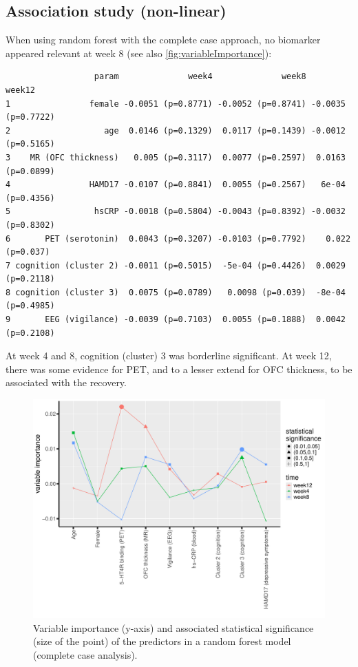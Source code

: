 \documentclass[12pt]{article}
\begin{document}
\subsection{Association study (non-linear)}
\label{sec:orgdb58d78}

When using random forest with the complete case approach, no biomarker
appeared relevant at week 8 (see also \autoref{fig:variableImportance}):
\label{}
\begin{verbatim}
                  param              week4              week8             week12
1                female -0.0051 (p=0.8771) -0.0052 (p=0.8741) -0.0035 (p=0.7722)
2                   age  0.0146 (p=0.1329)  0.0117 (p=0.1439) -0.0012 (p=0.5165)
3    MR (OFC thickness)   0.005 (p=0.3117)  0.0077 (p=0.2597)  0.0163 (p=0.0899)
4                HAMD17 -0.0107 (p=0.8841)  0.0055 (p=0.2567)   6e-04 (p=0.4356)
5                 hsCRP -0.0018 (p=0.5804) -0.0043 (p=0.8392) -0.0032 (p=0.8302)
6       PET (serotonin)  0.0043 (p=0.3207) -0.0103 (p=0.7792)    0.022 (p=0.037)
7 cognition (cluster 2) -0.0011 (p=0.5015)  -5e-04 (p=0.4426)  0.0029 (p=0.2118)
8 cognition (cluster 3)  0.0075 (p=0.0789)   0.0098 (p=0.039)  -8e-04 (p=0.4985)
9       EEG (vigilance) -0.0039 (p=0.7103)  0.0055 (p=0.1888)  0.0042 (p=0.2108)
\end{verbatim}

At week 4 and 8, cognition (cluster) 3 was borderline significant. At
week 12, there was some evidence for PET, and to a lesser extend for
OFC thickness, to be associated with the recovery.

\begin{figure}[!h]
\centering
\includegraphics[trim={0 0 0 0},width=\textwidth]{./../figures/variableImportance.pdf}
\caption{\label{fig:variableImportance}Variable importance (y-axis) and associated statistical significance (size of the point) of the predictors in a random forest model (complete case analysis).}
\end{figure}
\end{document}
